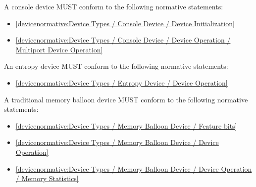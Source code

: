 A console device MUST conform to the following normative statements:

\begin{itemize}
\item \ref{devicenormative:Device Types / Console Device / Device Initialization}
\item \ref{devicenormative:Device Types / Console Device / Device Operation / Multiport Device Operation}
\end{itemize}

\label{sec:Conformance / Device Conformance / Entropy Device Conformance}

An entropy device MUST conform to the following normative statements:

\begin{itemize}
\item \ref{devicenormative:Device Types / Entropy Device / Device Operation}
\end{itemize}

\label{sec:Conformance / Device Conformance / Traditional Memory Balloon Device Conformance}

A traditional memory balloon device MUST conform to the following normative statements:

\begin{itemize}
\item \ref{devicenormative:Device Types / Memory Balloon Device / Feature bits}
\item \ref{devicenormative:Device Types / Memory Balloon Device / Device Operation}
\item \ref{devicenormative:Device Types / Memory Balloon Device / Device Operation / Memory Statistics}
\end{itemize}

\label{sec:Conformance / Device Conformance / SCSI Host Device Conformance}

